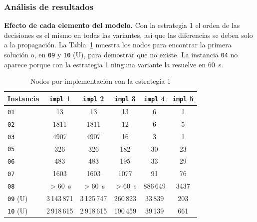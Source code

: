 \subsubsection{Análisis de resultados}

\textbf{Efecto de cada elemento del modelo.} Con la estrategia 1 el orden de las decisiones es el mismo en todas las variantes, así que las diferencias se deben solo a la propagación. La Tabla~\ref{tab:rect-impl-nodos} muestra los nodos para encontrar la primera solución o, en \texttt{09} y \texttt{10} (U), para demostrar que no existe. La instancia \texttt{04} no aparece porque con la estrategia 1 ninguna variante la resuelve en 60~s.

\begin{table}[htbp]
    \caption{Nodos por implementación con la estrategia 1}
    \label{tab:rect-impl-nodos}
    \begin{tabular}{@{}lccccc@{}}
        \toprule
        Instancia        & \texttt{impl} 1 & \texttt{impl} 2 & \texttt{impl} 3 & \texttt{impl} 4 & \texttt{impl} 5 \\
        \midrule
        \texttt{01}      & 13              & 13              & 13              & 6               & 1               \\
        \texttt{02}      & 1811            & 1811            & 12              & 6               & 5               \\
        \texttt{03}      & 4907            & 4907            & 16              & 3               & 1               \\
        \texttt{05}      & 326             & 326             & 182             & 30              & 23              \\
        \texttt{06}      & 483             & 483             & 195             & 33              & 29              \\
        \texttt{07}      & 1603            & 1603            & 1077            & 91              & 76              \\
        \texttt{08}      & $>60$~s         & $>60$~s         & $>60$~s         & 886\,649        & 3437            \\
        \texttt{09} (U)  & 3\,143\,871     & 3\,125\,747     & 260\,823        & 33\,839         & 203             \\
        \texttt{10} (U)  & 2\,918\,615     & 2\,918\,615     & 190\,459        & 39\,139         & 661             \\
        \bottomrule
    \end{tabular}
\end{table}

